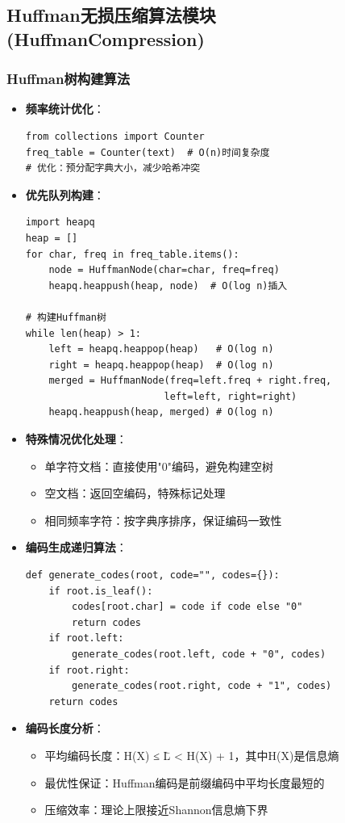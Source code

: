 \documentclass[12pt,a4paper]{article}
\begin{document}
\subsection{Huffman无损压缩算法模块 (HuffmanCompression)}
\subsubsection{Huffman树构建算法}
\begin{itemize}
    \item \textbf{频率统计优化}：
    \begin{verbatim}
from collections import Counter
freq_table = Counter(text)  # O(n)时间复杂度
# 优化：预分配字典大小，减少哈希冲突
    \end{verbatim}
    \item \textbf{优先队列构建}：
    \begin{verbatim}
import heapq
heap = []
for char, freq in freq_table.items():
    node = HuffmanNode(char=char, freq=freq)
    heapq.heappush(heap, node)  # O(log n)插入

# 构建Huffman树
while len(heap) > 1:
    left = heapq.heappop(heap)   # O(log n)
    right = heapq.heappop(heap)  # O(log n) 
    merged = HuffmanNode(freq=left.freq + right.freq, 
                        left=left, right=right)
    heapq.heappush(heap, merged) # O(log n)
    \end{verbatim}
    \item \textbf{特殊情况优化处理}：
    \begin{itemize}
        \item 单字符文档：直接使用"0"编码，避免构建空树
        \item 空文档：返回空编码，特殊标记处理
        \item 相同频率字符：按字典序排序，保证编码一致性
    \end{itemize}
    \item \textbf{编码生成递归算法}：
    \begin{verbatim}
def generate_codes(root, code="", codes={}):
    if root.is_leaf():
        codes[root.char] = code if code else "0"
        return codes
    if root.left:
        generate_codes(root.left, code + "0", codes)
    if root.right:  
        generate_codes(root.right, code + "1", codes)
    return codes
    \end{verbatim}
    \item \textbf{编码长度分析}：
    \begin{itemize}
        \item 平均编码长度：H(X) ≤ L̄ < H(X) + 1，其中H(X)是信息熵
        \item 最优性保证：Huffman编码是前缀编码中平均长度最短的
        \item 压缩效率：理论上限接近Shannon信息熵下界
    \end{itemize}
\end{itemize}
\end{document}
